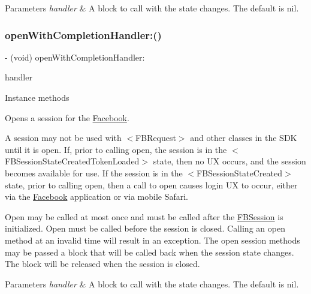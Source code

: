 \begin{DoxyParams}{Parameters}
{\em handler} & A block to call with the state changes. The default is nil. \\
\hline
\end{DoxyParams}
\mbox{\label{interfaceFBSession_a874152230789c87cd181d1f976e3715f}} 
\subsubsection{\texorpdfstring{open\+With\+Completion\+Handler\+:()}{openWithCompletionHandler:()}\hspace{0.1cm}{\footnotesize\ttfamily [5/5]}}
{\footnotesize\ttfamily -\/ (void) open\+With\+Completion\+Handler\+: \begin{DoxyParamCaption}\item[{(F\+B\+Session\+State\+Handler)}]{handler }\end{DoxyParamCaption}}

Instance methods

Opens a session for the \hyperlink{interfaceFacebook}{Facebook}.

A session may not be used with $<$\+F\+B\+Request$>$ and other classes in the S\+DK until it is open. If, prior to calling open, the session is in the $<$\+F\+B\+Session\+State\+Created\+Token\+Loaded$>$ state, then no UX occurs, and the session becomes available for use. If the session is in the $<$\+F\+B\+Session\+State\+Created$>$ state, prior to calling open, then a call to open causes login UX to occur, either via the \hyperlink{interfaceFacebook}{Facebook} application or via mobile Safari.

Open may be called at most once and must be called after the {\ttfamily \hyperlink{interfaceFBSession}{F\+B\+Session}} is initialized. Open must be called before the session is closed. Calling an open method at an invalid time will result in an exception. The open session methods may be passed a block that will be called back when the session state changes. The block will be released when the session is closed.


\begin{DoxyParams}{Parameters}
{\em handler} & A block to call with the state changes. The default is nil. \\
\hline
\end{DoxyParams}
\mbox{\label{interfaceFBSession_ac78d18a8fc82c995e326f2866ca9298f}} 

